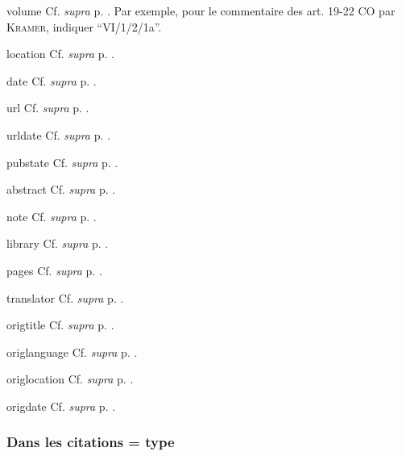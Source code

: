 \documentclass[a4paper]{ltxdockit}[2011/03/25]
\newcommand{\supra}{\emph{supra}\xspace}
\newcommand{\Cf}{\textnormal{Cf. }}
\newcommand{\GM}{\enquote}
\newcommand{\Pex}{\textnormal{Par exemple}\xspace}
\begin{document}
\begin{marglist}
\item[volume] \Cf \supra p. \pageref{volume}. \Pex, pour le commentaire des art. 19-22 CO par \textsc{Kramer}, indiquer \GM{VI/1/2/1a}. 
\item[location] \Cf \supra p. \pageref{location}. 
\item[date] \Cf \supra p. \pageref{date}.
\item[url] \Cf \supra p. \pageref{url}.
\item[urldate] \Cf \supra p. \pageref{urldate}.
\item[pubstate] \Cf \supra p. \pageref{pubstate}. 
\item[abstract] \Cf \supra p. \pageref{abstract}. 
\item[note] \Cf \supra p. \pageref{note}. 
\item[library] \Cf \supra p. \pageref{library}.
\item[pages] \Cf \supra p. \pageref{pagesbook}.
\item[translator] \Cf \supra p. \pageref{translator}.
\item[origtitle] \Cf \supra p. \pageref{origtitle}.
\item[origlanguage] \Cf \supra p. \pageref{origlanguage}.
\item[origlocation] \Cf \supra p. \pageref{origlocation}.
\item[origdate] \Cf \supra p. \pageref{origdate}.
\end{marglist}

\subsubsection{Dans les citations = type }
\end{document}
